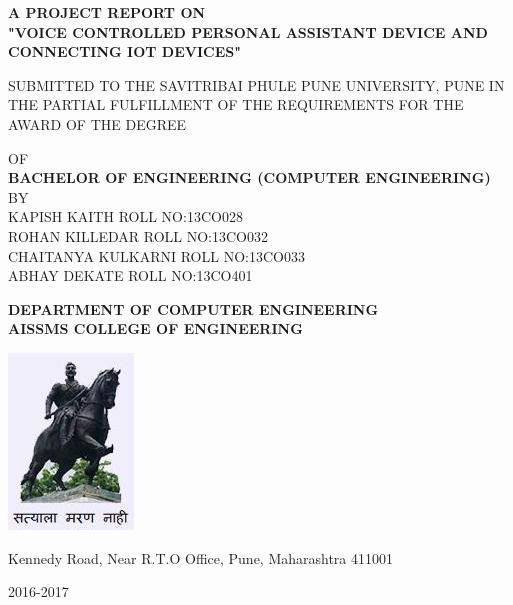\begin{titlepage}
\centering


%

\textbf{A PROJECT REPORT ON}\\\vspace{1cm}\large\textbf{"VOICE CONTROLLED PERSONAL ASSISTANT DEVICE AND CONNECTING IOT DEVICES"}\\\vspace{1cm}

SUBMITTED TO THE SAVITRIBAI PHULE PUNE UNIVERSITY, PUNE
IN THE PARTIAL FULFILLMENT OF THE REQUIREMENTS 
FOR THE AWARD OF THE DEGREE 
\begin{center}

\vspace{1cm} OF\\\vspace{1cm}\textbf{BACHELOR OF ENGINEERING (COMPUTER ENGINEERING) }\\\vspace{1cm}BY\vspace{1cm}\\
{\small{KAPISH KAITH} \hspace{22mm} {\small ROLL NO:13CO028}\\{ROHAN KILLEDAR} \hspace{15mm} {\small ROLL NO:13CO032 } \\{CHAITANYA KULKARNI} \hspace{5mm} {\small ROLL NO:13CO033 } \\{ABHAY DEKATE} \hspace{20mm} {\small ROLL NO:13CO401 }\\\vspace{1cm}}

\end{center}
\textbf{DEPARTMENT OF COMPUTER ENGINEERING}\\ 
\textbf{AISSMS COLLEGE OF ENGINEERING} \\
\begin{center}
\includegraphics[scale=0.6]{logo.png}
\end{center}
Kennedy Road, Near R.T.O Office, Pune, Maharashtra 411001

2016-2017
\end{titlepage}
